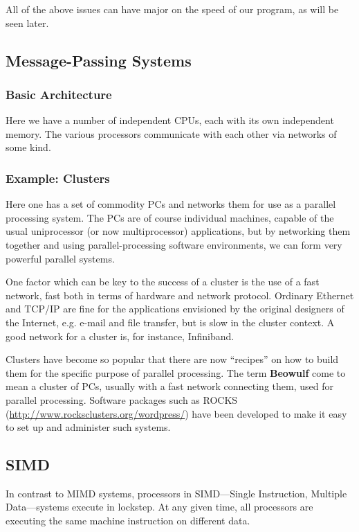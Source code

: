 All of the above issues can have major on the speed of our program, as
will be seen later.

\subsection{Message-Passing Systems}

\subsubsection{Basic Architecture}

Here we have a number of independent CPUs, each with its own independent
memory.  The various processors communicate with each other via networks
of some kind.

\subsubsection{Example:  Clusters}

Here one has a set of commodity PCs and networks them for use as a
parallel processing system. The PCs are of course individual machines,
capable of the usual uniprocessor (or now multiprocessor) applications,
but by networking them together and using parallel-processing software
environments, we can form very powerful parallel systems.

One factor which can be key to the success of a cluster is the use of a fast
network, fast both in terms of hardware and network protocol.  Ordinary
Ethernet and TCP/IP are fine for the applications envisioned by the
original designers of the Internet, e.g. e-mail and file transfer, but
is slow in the cluster context.  A good network for a cluster is, for instance,
Infiniband.

Clusters have become so popular that there are now ``recipes'' on how to
build them for the specific purpose of parallel processing.  The term
{\bf Beowulf} come to mean a cluster of PCs, usually with a fast network
connecting them, used for parallel processing.  Software packages such
as ROCKS (\url{http://www.rocksclusters.org/wordpress/}) have been
developed to make it easy to set up and administer such systems.

\subsection{SIMD}

In contrast to MIMD systems, processors in SIMD---Single Instruction,
Multiple Data---systems execute in lockstep.  At any given time, all
processors are executing the same machine instruction on different data.

